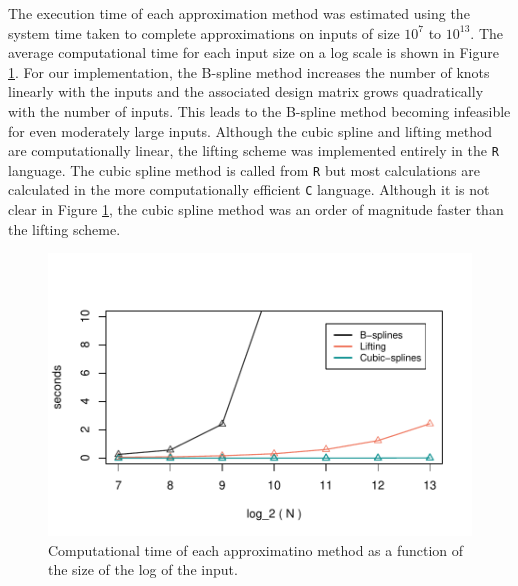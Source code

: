 The execution time of each approximation method was estimated
using the system time taken to complete approximations on 
inputs of size $10^7$ to $10^{13}$. 
The average computational time for
each input size on a log scale is shown in Figure \ref{fig:benchmark}.
For our implementation, 
the B-spline method increases the number of knots linearly with 
the inputs and the associated design matrix grows quadratically
with the number of inputs. This leads to the B-spline method becoming 
infeasible for even moderately large inputs. 
Although the cubic spline and lifting method are computationally 
linear, the lifting scheme was implemented entirely in the \texttt{R}
language. The cubic spline method is called from \texttt{R} but 
most calculations are calculated in the more computationally efficient \texttt{C} language. Although it is not clear in Figure 
\ref{fig:benchmark}, the cubic spline method was an order of magnitude faster than the lifting scheme. 

\begin{figure}[!htbp]
  \begin{center}
  \includegraphics[width = \textwidth, keepaspectratio]{./figs/benchmark-benchmark.pdf}
  \end{center}
  \caption{Computational time of each approximatino method
   as a function of the size of the log of the input.}
  \label{fig:benchmark} 
\end{figure}


